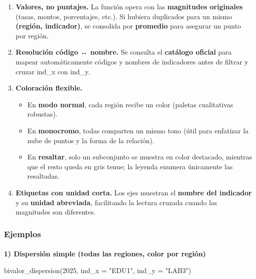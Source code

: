 \documentclass[
  11pt,
  letterpaper,
  DIV=11,
  numbers=noendperiod]{scrartcl}
\makeatletter
\let\oldparagraph\paragraph
\renewcommand{\paragraph}{
    \@ifstar
      \xxxParagraphStar
      \xxxParagraphNoStar
  }
\newcommand{\xxxParagraphStar}[1]{\oldparagraph*{#1}\mbox{}}
\newcommand{\xxxParagraphNoStar}[1]{\oldparagraph{#1}\mbox{}}
\newenvironment{Shaded}{\begin{snugshade}}{\end{snugshade}}
\newcommand{\AttributeTok}[1]{\textcolor[rgb]{0.40,0.45,0.13}{#1}}
\newcommand{\DecValTok}[1]{\textcolor[rgb]{0.68,0.00,0.00}{#1}}
\newcommand{\FunctionTok}[1]{\textcolor[rgb]{0.28,0.35,0.67}{#1}}
\newcommand{\NormalTok}[1]{\textcolor[rgb]{0.00,0.23,0.31}{#1}}
\newcommand{\StringTok}[1]{\textcolor[rgb]{0.13,0.47,0.30}{#1}}
\makeatother
\begin{document}
\begin{enumerate}
\def\labelenumi{\arabic{enumi}.}
\item
  \textbf{Valores, no puntajes.} La función opera con las
  \textbf{magnitudes originales} (tasas, montos, porcentajes, etc.). Si
  hubiera duplicados para un mismo \textbf{(región, indicador)}, se
  consolida por \textbf{promedio} para asegurar un punto por región.
\item
  \textbf{Resolución código ↔ nombre.} Se consulta el \textbf{catálogo
  oficial} para mapear automáticamente códigos y nombres de indicadores
  antes de filtrar y cruzar ind\_x con ind\_y.
\item
  \textbf{Coloración flexible.}

  \begin{itemize}
  \item
    En \textbf{modo normal}, cada región recibe un color (paletas
    cualitativas robustas).
  \item
    En \textbf{monocromo}, todas comparten un mismo tono (útil para
    enfatizar la nube de puntos y la forma de la relación).
  \item
    En \textbf{resaltar}, solo un subconjunto se muestra en color
    destacado, mientras que el resto queda en gris tenue; la leyenda
    enumera únicamente las resaltadas.
  \end{itemize}
\item
  \textbf{Etiquetas con unidad corta.} Los ejes muestran el
  \textbf{nombre del indicador} y su \textbf{unidad abreviada},
  facilitando la lectura cruzada cuando las magnitudes son diferentes.
\end{enumerate}

\subsubsection{\texorpdfstring{\textbf{Ejemplos}}{Ejemplos}}\label{ejemplos-21}

\paragraph{\texorpdfstring{\textbf{1) Dispersión simple (todas las
regiones, color por
región)}}{1) Dispersión simple (todas las regiones, color por región)}}\label{dispersiuxf3n-simple-todas-las-regiones-color-por-regiuxf3n}

\begin{Shaded}
\begin{Highlighting}[]
\FunctionTok{bivalor\_dispersion}\NormalTok{(}\DecValTok{2025}\NormalTok{, }
                   \AttributeTok{ind\_x =} \StringTok{"EDU1"}\NormalTok{, }
                   \AttributeTok{ind\_y =} \StringTok{"LAB3"}\NormalTok{)}
\end{Highlighting}
\end{Shaded}
\end{document}
